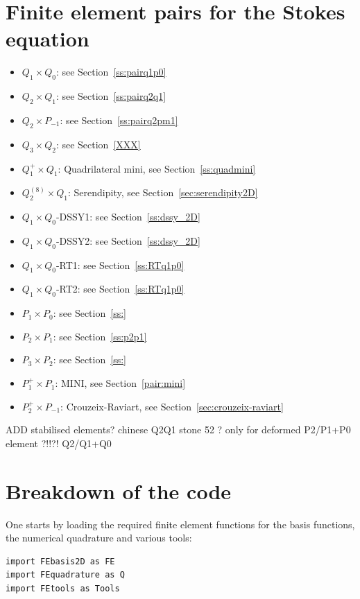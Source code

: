\section*{Finite element pairs for the Stokes equation}

\begin{itemize}
\item $Q_1\times Q_0$: see Section~\ref{ss:pairq1p0}
\item $Q_2\times Q_1$: see Section~\ref{ss:pairq2q1}
\item $Q_2\times P_{-1}$: see Section~\ref{ss:pairq2pm1}
\item $Q_3\times Q_2$: see Section~\ref{XXX}
\item $Q_1^+\times Q_1$: Quadrilateral mini, see Section~\ref{ss:quadmini}
\item $Q_2^{(8)}\times Q_1$: Serendipity, see Section~\ref{sec:serendipity2D}
\item $Q_1\times Q_0$-DSSY1: see Section~\ref{ss:dssy_2D}
\item $Q_1\times Q_0$-DSSY2: see Section~\ref{ss:dssy_2D}
\item $Q_1\times Q_0$-RT1: see Section~\ref{ss:RTq1p0}
\item $Q_1\times Q_0$-RT2: see Section~\ref{ss:RTq1p0}
\item $P_1\times P_0$: see Section~\ref{ss:}
\item $P_2\times P_1$: see Section~\ref{ss:p2p1}
\item $P_3\times P_2$: see Section~\ref{ss:}
\item $P_1^{+}\times P_{1}$: MINI, see Section~\ref{pair:mini}
\item $P_2^+\times P_{-1}$: Crouzeix-Raviart, see Section~\ref{sec:crouzeix-raviart}
\end{itemize}

ADD stabilised elements?
chinese Q2Q1 stone 52 ? only for deformed
P2/P1+P0 element ?!!?!
Q2/Q1+Q0

\section*{Breakdown of the code}

One starts by loading the required finite element functions 
for the basis functions, the numerical quadrature and various tools:
\begin{lstlisting}
import FEbasis2D as FE
import FEquadrature as Q
import FEtools as Tools 
\end{lstlisting}

